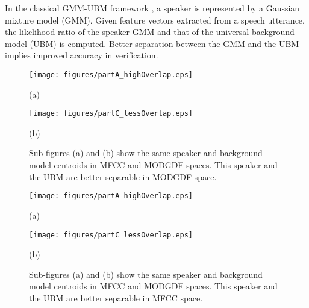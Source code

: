 \documentclass{article}
\begin{document}
In the classical GMM-UBM framework \cite{reynoldsAdaptedGMM}, a speaker is
represented by a Gaussian mixture model (GMM). Given feature vectors extracted
from a speech utterance, the likelihood ratio of the speaker GMM and that of the
universal background model (UBM) is computed. Better separation between the GMM
and the UBM implies improved accuracy in verification.

\begin{figure}[h]
\centering 
\begin{minipage}[c]{0.5\textwidth}
\centering \hspace{-6cm}
    \texttt{[image: figures/partA\_highOverlap.eps]}
	\caption*{(a)}
	\label{fig:GmmMgdOpt}
\end{minipage}%
\begin{minipage}[c]{0.35\textwidth}
\centering  \hspace{-4.5cm}
    \texttt{[image: figures/partC\_lessOverlap.eps]}
	\caption*{(b)}
	\label{fig:GmMfcOpt}
\end{minipage}
\caption{Sub-figures (a) and (b) show the same speaker and background model centroids in MFCC and MODGDF spaces. This speaker and the UBM are better separable in 
MODGDF space.}
\label{fig:ubm_sep1}
\end{figure}

\begin{figure}[h]
\centering 
\begin{minipage}[c]{0.5\textwidth}
\centering \hspace{-6cm}
    \texttt{[image: figures/partA\_highOverlap.eps]}
	\caption*{(a)}
	\label{fig:GmmMgdOpt}
\end{minipage}%
\begin{minipage}[c]{0.35\textwidth}
\centering  \hspace{-4.5cm}
    \texttt{[image: figures/partC\_lessOverlap.eps]}
	\caption*{(b)}
	\label{fig:GmMfcOpt}
\end{minipage}
\caption{Sub-figures (a) and (b) show the same speaker and background model centroids in MFCC and MODGDF spaces. This speaker and the UBM are better separable in 
MFCC space.}
\label{fig:ubm_sep2}
\end{figure}
\end{document}
